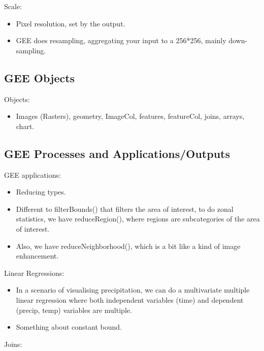 \documentclass[
  letterpaper,
  DIV=11,
  numbers=noendperiod]{scrreprt}
\providecommand{\tightlist}{%
  \setlength{\itemsep}{0pt}\setlength{\parskip}{0pt}}\usepackage{longtable,booktabs,array}
\begin{document}
Scale:

\begin{itemize}
\tightlist
\item
  Pixel resolution, set by the output.
\item
  GEE does resampling, aggregating your input to a 256*256, mainly
  down-sampling.
\end{itemize}

\hypertarget{gee-objects}{%
\subsection{GEE Objects}\label{gee-objects}}

Objects:

\begin{itemize}
\tightlist
\item
  Images (Rasters), geometry, ImageCol, features, featureCol, joins,
  arrays, chart.
\end{itemize}

\hypertarget{gee-processes-and-applicationsoutputs}{%
\subsection{GEE Processes and
Applications/Outputs}\label{gee-processes-and-applicationsoutputs}}

GEE applications:

\begin{itemize}
\tightlist
\item
  Reducing types.
\item
  Different to filterBounds() that filters the area of interest, to do
  zonal statistics, we have reduceRegion(), where regions are
  subcategories of the area of interest.
\item
  Also, we have reduceNeighborhood(), which is a bit like a kind of
  image enhancement.
\end{itemize}

Linear Regressions:

\begin{itemize}
\tightlist
\item
  In a scenario of visualising precipitation, we can do a multivariate
  multiple linear regression where both independent variables (time) and
  dependent (precip, temp) variables are multiple.
\item
  Something about constant bound.
\end{itemize}

Joins:
\end{document}
